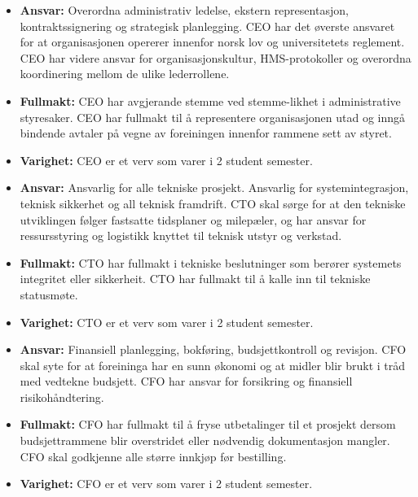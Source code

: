 \documentclass{rapport}
\begin{document}
\begin{itemize}
  \item \textbf{Ansvar:} Overordna administrativ ledelse, ekstern representasjon, kontraktssignering
        og strategisk planlegging. CEO har det øverste ansvaret for at organisasjonen
        opererer innenfor norsk lov og universitetets reglement. CEO har videre ansvar for
        organisasjonskultur, HMS-protokoller og overordna koordinering mellom de ulike
        lederrollene.
  \item \textbf{Fullmakt:} CEO har avgjerande stemme ved stemme-likhet i administrative
        styresaker. CEO har fullmakt til å representere organisasjonen utad og inngå
        bindende avtaler på vegne av foreiningen innenfor rammene sett av styret.
  \item \textbf{Varighet:} CEO er et verv som varer i 2 student semester.
\end{itemize}

\begin{itemize}
  \item \textbf{Ansvar:} Ansvarlig for alle tekniske prosjekt. Ansvarlig for systemintegrasjon, teknisk
        sikkerhet og all teknisk framdrift. CTO skal sørge for at den tekniske utviklingen
        følger fastsatte tidsplaner og milepæler, og har ansvar for ressursstyring og logistikk
        knyttet til teknisk utstyr og verkstad.
  \item \textbf{Fullmakt:} CTO har fullmakt i tekniske beslutninger som berører systemets integritet
        eller sikkerheit. CTO har fullmakt til å kalle inn til tekniske statusmøte.
  \item \textbf{Varighet:} CTO er et verv som varer i 2 student semester.
\end{itemize}

\begin{itemize}
  \item \textbf{Ansvar:} Finansiell planlegging, bokføring, budsjettkontroll og revisjon. CFO skal syte
        for at foreininga har en sunn økonomi og at midler blir brukt i tråd med vedtekne
        budsjett. CFO har ansvar for forsikring og finansiell risikohåndtering.
  \item \textbf{Fullmakt:} CFO har fullmakt til å fryse utbetalinger til et prosjekt dersom
        budsjettrammene blir overstridet eller nødvendig dokumentasjon mangler. CFO skal
        godkjenne alle større innkjøp før bestilling.
  \item \textbf{Varighet:} CFO er et verv som varer i 2 student semester.
\end{itemize}
\end{document}
